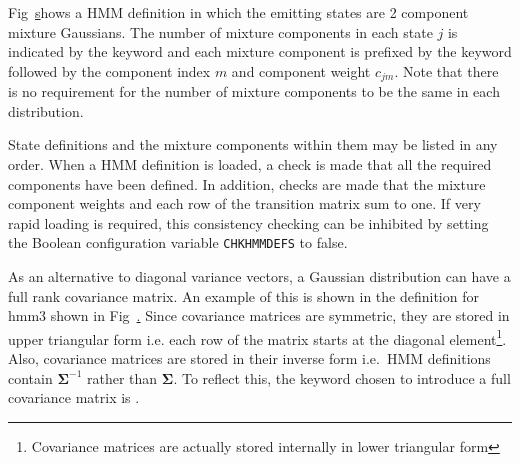 Fig~\href{f:hmm2def} shows a HMM definition in which
the emitting states are 2 component mixture Gaussians.
The number of mixture components in each state $j$ is indicated by the keyword
 and each mixture component 
is prefixed by the keyword   followed by the 
component index $m$ and component weight $c_{jm}$.  Note
that there is no requirement for the number of mixture components
to be the same in each distribution.


State definitions and the mixture components within them may be
listed in any order.  When a HMM definition is loaded, a check is made
that all the required components have been defined.  In addition,
checks are made that the mixture component weights and each row
of the transition matrix sum to one.
If very rapid loading is required, this consistency checking can be inhibited
by setting the Boolean configuration variable 
\texttt{CHKHMMDEFS} to
false.

As an alternative to diagonal variance vectors, a Gaussian distribution
can have a full rank covariance matrix.   An example of
this is shown in the definition for \textsf{hmm3} shown in 
Fig~\href{f:hmm3def}.  Since covariance matrices are symmetric,
they are stored in upper triangular form  
i.e. each row of the matrix
starts at the diagonal element\footnote{
Covariance matrices are actually stored internally in lower triangular
form}.  Also, covariance matrices are stored
in their inverse form i.e.\ HMM definitions contain $\bm{\Sigma}^{-1}$
rather than  $\bm{\Sigma}$.  To reflect this, the keyword chosen to
introduce a full covariance matrix is .  


